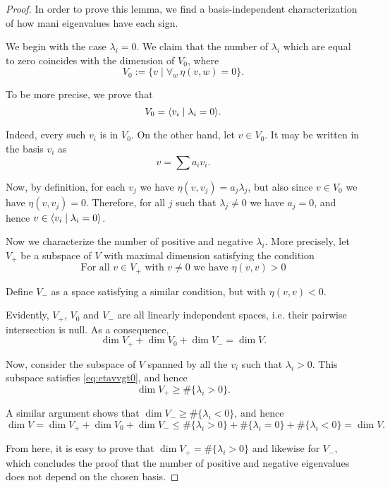\begin{proof}
In order to prove this lemma, we find a basis-independent characterization of how mani eigenvalues have each sign.

We begin with the case $\lambda_i = 0$. We claim that the number of $\lambda_i$ which are equal to zero coincides with the dimension of $V_0$, where
\begin{equation}
V_0 := \{v \mid \forall_w\, \eta(v,w) = 0\}.
\end{equation}

To be more precise, we prove that
\begin{equation}
V_0 =  \langle v_i \mid \lambda_i = 0\rangle.
\end{equation}

Indeed, every such $v_i$ is in $V_0$. On the other hand, let $v \in V_0$. It may be written in the basis $v_i$ as
\begin{equation}
v = \sum a_i v_i.
\end{equation}

Now, by definition, for each $v_j$ we have $\eta(v,v_j) = a_j \lambda_j$, but also since $v \in V_0$ we have $\eta(v,v_j) = 0$. Therefore, for all $j$ such that $\lambda_j \neq 0$ we have $a_j = 0$, and hence $v \in \langle v_i \mid \lambda_i = 0\rangle$.

\smallskip

Now we characterize the number of positive and negative $\lambda_i$. More precisely, let $V_+$ be a subspace of $V$ with maximal dimension satisfying the condition
\begin{equation}\label{eq:etavvgt0}
\text{For all $v \in V_+$ with $v \neq 0$ we have $\eta(v,v) > 0$}
\end{equation}

Define $V_-$ as a space satisfying a similar condition, but with $\eta(v,v) < 0$.

Evidently, $V_+$, $V_0$ and $V_-$ are all linearly independent spaces, i.e. their pairwise intersection is null. As a consequence,
\begin{equation}
\dim V_+ + \dim V_0 + \dim V_- = \dim V.
\end{equation}

Now, consider the subspace of $V$ spanned by all the $v_i$ such that $\lambda_i > 0$. This subspace satisfies \eqref{eq:etavvgt0}, and hence
\begin{equation}
\dim V_+ \geq \#\{\lambda_i > 0\}.
\end{equation}

A similar argument shows that $\dim V_- \geq \#\{\lambda_i < 0\}$, and hence
\begin{equation}
\dim V = \dim V_+ + \dim V_0 + \dim V_- \leq \#\{\lambda_i > 0\} + \#\{\lambda_i = 0\} + \#\{\lambda_i < 0\} = \dim V.
\end{equation}

From here, it is easy to prove that $\dim V_+ = \#\{\lambda_i > 0\}$ and likewise for $V_-$, which concludes the proof that the number of positive and negative eigenvalues does not depend on the chosen basis.
\end{proof}

